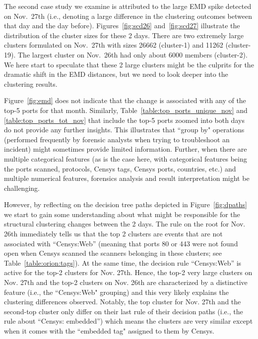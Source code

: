 \documentclass[manuscript, nonacm]{acmart}
\begin{document}


The second case study we examine is attributed to the large EMD spike
detected on Nov.\ 27th (i.e., denoting a large difference in the clustering
outcomes between that day and the day before). Figures~\ref{fig:scd26} and~\ref{fig:scd27}
illustrate the distribution of the cluster sizes for these 2 days.
There are two extremely large clusters formulated on Nov.\ 27th 
with sizes 26662 (cluster-1) and 11262 (cluster-19). The largest cluster on Nov.\ 26th had only
about 6000 members (cluster-2). We here start to speculate that these 2 large clusters might be the culprits 
for the dramatic shift in the EMD distances, but we need to look
deeper into the clustering results. 

Figure~\ref{fig:emd} does not indicate that the change is associated with
any of the top-5 ports for that month. Similarly,
Table~\ref{table:top_ports_unique_nov} and \ref{table:top_ports_tot_nov} that include the top-5 ports zoomed into
both days do not provide any further insights. This illustrates that
``group by" operations (performed frequently by forensic analysts when trying
to troubleshoot an incident) might sometimes provide limited information. 
Further, when there are multiple categorical features (as is the case here, 
with categorical features being the ports scanned, protocols, Censys tags, Censys ports, countries, etc.)
and multiple numerical features, forensics analysis and result interpretation might be challenging.

However, by reflecting on the decision tree paths depicted in Figure~\ref{fig:dpaths}
we start to gain some understanding about what might be responsible for the structural clustering
changes between the 2 days. The rule on the root for Nov. 26th immediately tells us
that the top 2 clusters are events that are not associated with “Censys:Web” (meaning that 
ports 80 or 443 were not found open when Censys scanned the scanners belonging in these clusters;
see Table~\ref{table:orion:tags}). 
At the same time, 
the decision rule “Censys:Web” is active for the top-2 clusters for Nov. 27th. Hence, the
top-2 very large clusters on Nov. 27th and the top-2 clusters on Nov. 26th
are characterized by a distinctive feature (i.e., the ``Censys:Web" grouping)
and this very likely explains the clustering differences observed.
Notably, the top cluster for Nov. 27th and the second-top cluster only differ on their last rule of 
their decision paths (i.e., the rule about “Censys: embedded”) which means
the clusters are very similar except when it comes with the ``embedded tag" assigned to them by Censys.
\end{document}
